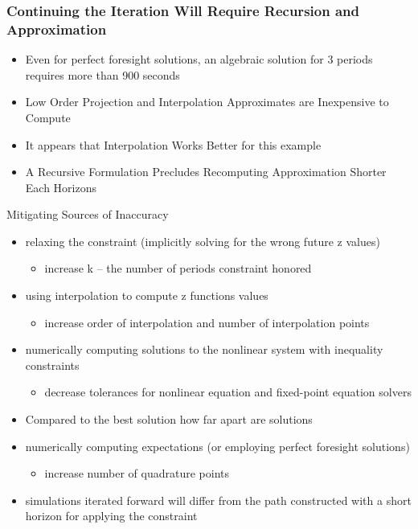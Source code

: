 \documentclass{beamer}
\begin{document}
    \begin{frame}
      \frametitle{Continuing the Iteration Will Require Recursion and Approximation}
      \begin{itemize}
      \item Even for perfect foresight solutions, an algebraic solution for 3 periods requires more than 900 seconds
      \item Low Order Projection and Interpolation Approximates are Inexpensive to Compute
      \item It appears that Interpolation Works Better for this example
      \item A Recursive Formulation Precludes Recomputing Approximation Shorter Each Horizons
      \end{itemize}
    \end{frame}
\begin{frame}{Mitigating Sources of Inaccuracy}


\begin{itemize}
	\item relaxing the constraint (implicitly solving for the wrong future z values)
	\begin{itemize}
\item	increase k -- the number of periods constraint honored
	\end{itemize}
     \item using interpolation to compute z functions values
     	\begin{itemize}
     	\item 	increase order of interpolation and number of interpolation points
     	\end{itemize}    	
      \item numerically computing solutions to the nonlinear system with inequality constraints
      	\begin{itemize}
      \item		decrease tolerances for nonlinear equation and fixed-point equation solvers
      	\end{itemize}      	 
      \item Compared to the best solution how far apart are solutions
\item numerically computing expectations (or  employing perfect foresight solutions)
	\begin{itemize}
	\item	increase number of quadrature points
	\end{itemize}

\item simulations iterated forward will differ from the path constructed with a short horizon for applying the constraint

\end{itemize}
\end{frame}
\end{document}
